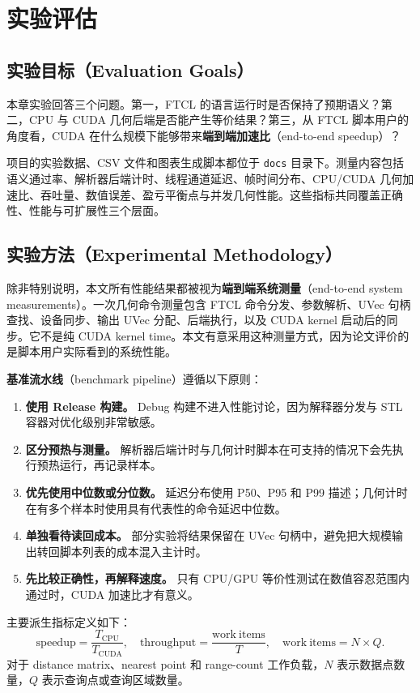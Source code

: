 ﻿\chapter{实验评估}

\section{实验目标（Evaluation Goals）}
本章实验回答三个问题。第一，FTCL 的语言运行时是否保持了预期语义？第二，CPU 与 CUDA 几何后端是否能产生等价结果？第三，从 FTCL 脚本用户的角度看，CUDA 在什么规模下能够带来\textbf{端到端加速比}（end-to-end speedup）？

项目的实验数据、CSV 文件和图表生成脚本都位于 \texttt{docs} 目录下。测量内容包括语义通过率、解析器后端计时、线程通道延迟、帧时间分布、CPU/CUDA 几何加速比、吞吐量、数值误差、盈亏平衡点与并发几何性能。这些指标共同覆盖正确性、性能与可扩展性三个层面。

\section{实验方法（Experimental Methodology）}
除非特别说明，本文所有性能结果都被视为\textbf{端到端系统测量}（end-to-end system measurements）。一次几何命令测量包含 FTCL 命令分发、参数解析、UVec 句柄查找、设备同步、输出 UVec 分配、后端执行，以及 CUDA kernel 启动后的同步。它不是纯 CUDA kernel time。本文有意采用这种测量方式，因为论文评价的是脚本用户实际看到的系统性能。

\textbf{基准流水线}（benchmark pipeline）遵循以下原则：

\begin{enumerate}
  \item \textbf{使用 Release 构建。} Debug 构建不进入性能讨论，因为解释器分发与 STL 容器对优化级别非常敏感。
  \item \textbf{区分预热与测量。} 解析器后端计时与几何计时脚本在可支持的情况下会先执行预热运行，再记录样本。
  \item \textbf{优先使用中位数或分位数。} 延迟分布使用 P50、P95 和 P99 描述；几何计时在有多个样本时使用具有代表性的命令延迟中位数。
  \item \textbf{单独看待读回成本。} 部分实验将结果保留在 UVec 句柄中，避免把大规模输出转回脚本列表的成本混入主计时。
  \item \textbf{先比较正确性，再解释速度。} 只有 CPU/GPU 等价性测试在数值容忍范围内通过时，CUDA 加速比才有意义。
\end{enumerate}

主要派生指标定义如下：
\[
  \mathrm{speedup} = \frac{T_{\mathrm{CPU}}}{T_{\mathrm{CUDA}}},
  \quad
  \mathrm{throughput} = \frac{\mathrm{work\ items}}{T},
  \quad
  \mathrm{work\ items} = N \times Q.
\]
对于 distance matrix、nearest point 和 range-count 工作负载，\(N\) 表示数据点数量，\(Q\) 表示查询点或查询区域数量。

